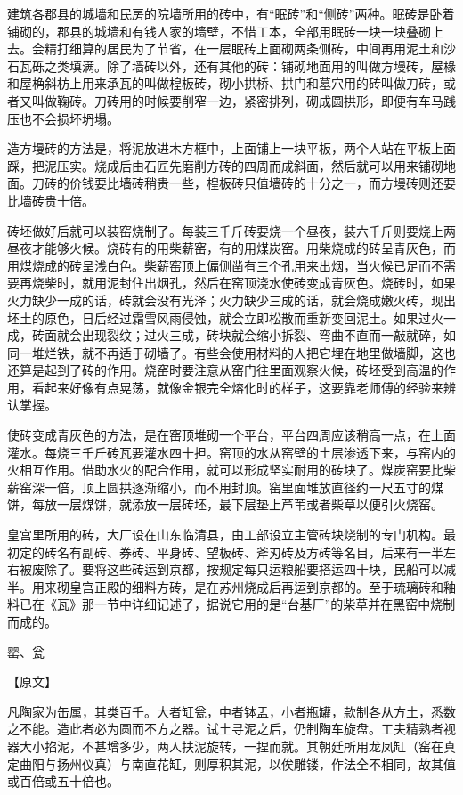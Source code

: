 \documentclass[12pt,UTF8]{ctexbook}
\begin{document}
建筑各郡县的城墙和民房的院墙所用的砖中，有“眠砖”和“侧砖”两种。眠砖是卧着铺砌的，郡县的城墙和有钱人家的墙壁，不惜工本，全部用眠砖一块一块叠砌上去。会精打细算的居民为了节省，在一层眠砖上面砌两条侧砖，中间再用泥土和沙石瓦砾之类填满。除了墙砖以外，还有其他的砖：铺砌地面用的叫做方墁砖，屋椽和屋桷斜枋上用来承瓦的叫做楻板砖，砌小拱桥、拱门和墓穴用的砖叫做刀砖，或者又叫做鞠砖。刀砖用的时候要削窄一边，紧密排列，砌成圆拱形，即便有车马践压也不会损坏坍塌。

造方墁砖的方法是，将泥放进木方框中，上面铺上一块平板，两个人站在平板上面踩，把泥压实。烧成后由石匠先磨削方砖的四周而成斜面，然后就可以用来铺砌地面。刀砖的价钱要比墙砖稍贵一些，楻板砖只值墙砖的十分之一，而方墁砖则还要比墙砖贵十倍。

砖坯做好后就可以装窑烧制了。每装三千斤砖要烧一个昼夜，装六千斤则要烧上两昼夜才能够火候。烧砖有的用柴薪窑，有的用煤炭窑。用柴烧成的砖呈青灰色，而用煤烧成的砖呈浅白色。柴薪窑顶上偏侧凿有三个孔用来出烟，当火候已足而不需要再烧柴时，就用泥封住出烟孔，然后在窑顶浇水使砖变成青灰色。烧砖时，如果火力缺少一成的话，砖就会没有光泽；火力缺少三成的话，就会烧成嫩火砖，现出坯土的原色，日后经过霜雪风雨侵蚀，就会立即松散而重新变回泥土。如果过火一成，砖面就会出现裂纹；过火三成，砖块就会缩小拆裂、弯曲不直而一敲就碎，如同一堆烂铁，就不再适于砌墙了。有些会使用材料的人把它埋在地里做墙脚，这也还算是起到了砖的作用。烧窑时要注意从窑门往里面观察火候，砖坯受到高温的作用，看起来好像有点晃荡，就像金银完全熔化时的样子，这要靠老师傅的经验来辨认掌握。

使砖变成青灰色的方法，是在窑顶堆砌一个平台，平台四周应该稍高一点，在上面灌水。每烧三千斤砖瓦要灌水四十担。窑顶的水从窑壁的土层渗透下来，与窑内的火相互作用。借助水火的配合作用，就可以形成坚实耐用的砖块了。煤炭窑要比柴薪窑深一倍，顶上圆拱逐渐缩小，而不用封顶。窑里面堆放直径约一尺五寸的煤饼，每放一层煤饼，就添放一层砖坯，最下层垫上芦苇或者柴草以便引火烧窑。

皇宫里所用的砖，大厂设在山东临清县，由工部设立主管砖块烧制的专门机构。最初定的砖名有副砖、券砖、平身砖、望板砖、斧刃砖及方砖等名目，后来有一半左右被废除了。要将这些砖运到京都，按规定每只运粮船要搭运四十块，民船可以减半。用来砌皇宫正殿的细料方砖，是在苏州烧成后再运到京都的。至于琉璃砖和釉料已在《瓦》那一节中详细记述了，据说它用的是“台基厂”的柴草并在黑窑中烧制而成的。

罂、瓮

【原文】

凡陶家为缶属，其类百千。大者缸瓮，中者钵盂，小者瓶罐，款制各从方土，悉数之不能。造此者必为圆而不方之器。试土寻泥之后，仍制陶车旋盘。工夫精熟者视器大小掐泥，不甚增多少，两人扶泥旋转，一捏而就。其朝廷所用龙凤缸（窑在真定曲阳与扬州仪真）与南直花缸，则厚积其泥，以俟雕镂，作法全不相同，故其值或百倍或五十倍也。
\end{document}
